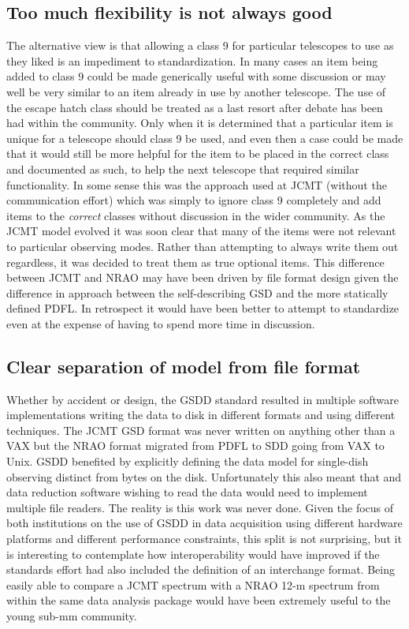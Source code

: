 \documentclass[final,authoryear,5p,times,twocolumn]{elsarticle}
\begin{document}
\subsection{Too much flexibility is not always good}

The alternative view is that allowing a class 9 for particular
telescopes to use as they liked is an impediment to
standardization. In many cases an item being added to class 9 could be
made generically useful with some discussion or may well be very
similar to an item already in use by another telescope. The use of the
escape hatch class should be treated as a last resort after debate has
been had within the community. Only when it is determined that a
particular item is unique for a telescope should class 9 be used, and
even then a case could be made that it would still be more helpful for
the item to be placed in the correct class and documented as such, to
help the next telescope that required similar functionality. In some
sense this was the approach used at JCMT (without the communication
effort) which was simply to ignore class 9 completely and add items to
the \emph{correct} classes without discussion in the wider
community. As the JCMT model evolved it was soon clear that many of
the items were not relevant to particular observing modes. Rather than
attempting to always write them out regardless, it was decided to
treat them as true optional items. This difference between JCMT and
NRAO may have been driven by file format design given the difference
in approach between the self-describing GSD and the more statically
defined PDFL.  In retrospect it would have been better to attempt to
standardize even at the expense of having to spend more time in
discussion.

\subsection{Clear separation of model from file format}

Whether by accident or design, the GSDD standard resulted in multiple
software implementations writing the data to disk in different formats
and using different techniques. The JCMT GSD format was never written
on anything other than a VAX but the NRAO format migrated from PDFL to
SDD going from VAX to Unix. GSDD benefited by explicitly defining the
data model for single-dish observing distinct from bytes on the
disk. Unfortunately this also meant that and data reduction software
wishing to read the data would need to implement multiple file
readers. The reality is this work was never done. Given the focus of
both institutions on the use of GSDD in data acquisition using
different hardware platforms and different performance constraints,
this split is not surprising, but it is interesting to contemplate how
interoperability would have improved if the standards effort had also
included the definition of an interchange format. Being easily able to
compare a JCMT spectrum with a NRAO 12-m spectrum from within the same
data analysis package would have been extremely useful to the young
sub-mm community.
\end{document}
